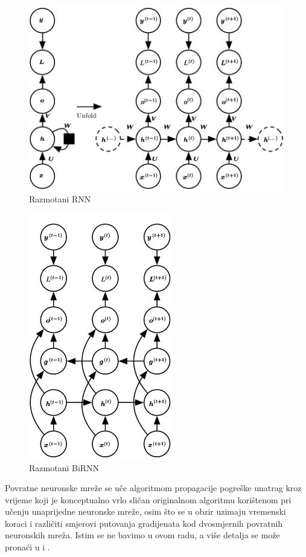 \documentclass[times, utf8, diplomski]{fer}
\begin{document}
\begin{figure}[H]
    \centering
    \includegraphics[scale=0.7]{figures/recognizer/rnn.jpg}
    \caption{Razmotani RNN}
    \label{fig:rnn}
\end{figure}

\begin{figure}[H]
    \centering
    \includegraphics[scale=0.7]{figures/recognizer/bi-rnn.jpg}
    \caption[Caption for LOF]{Razmotani BiRNN\footnotemark}
    \label{fig:bi-rnn}
\end{figure}

Povratne neuronske mreže se uče algoritmom propagacije pogreške unatrag kroz vrijeme  koji je konceptualno vrlo sličan originalnom algoritmu korištenom pri učenju unaprijedne neuronske mreže, osim što se u obzir uzimaju vremenski koraci i različiti smjerovi putovanja gradijenata kod dvosmjernih povratnih neuronskih mreža. Istim se ne bavimo u ovom radu, a više detalja se može pronaći u \citep{duboko} i \citep{Goodfellow-et-al-2016}. 
\end{document}
